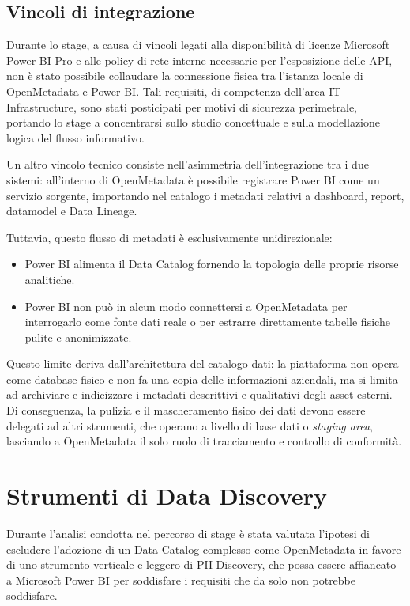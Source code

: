 \subsection{Vincoli di integrazione}
Durante lo stage, a causa di vincoli legati alla disponibilità di licenze Microsoft Power BI Pro e alle policy di rete interne necessarie per l'esposizione delle API, 
non è stato possibile collaudare la connessione fisica tra l'istanza locale di OpenMetadata e Power BI. 
Tali requisiti, di competenza dell'area IT Infrastructure, sono stati posticipati per motivi di sicurezza perimetrale, portando lo stage a concentrarsi sullo studio 
concettuale e sulla modellazione logica del flusso informativo.

Un altro vincolo tecnico consiste nell'asimmetria dell'integrazione tra i due sistemi: all'interno di OpenMetadata è possibile registrare Power BI come un servizio sorgente, 
importando nel catalogo i metadati relativi a dashboard, report, datamodel e Data Lineage.

Tuttavia, questo flusso di metadati è esclusivamente unidirezionale:
\begin{itemize}
    \item Power BI alimenta il Data Catalog fornendo la topologia delle proprie risorse analitiche.
    \item Power BI non può in alcun modo connettersi a OpenMetadata per interrogarlo come fonte dati reale o per estrarre direttamente tabelle fisiche pulite e anonimizzate.
\end{itemize}

\noindent Questo limite deriva dall'architettura del catalogo dati: la piattaforma non opera come database fisico e non fa una copia delle informazioni aziendali, ma si limita 
ad archiviare e indicizzare i metadati descrittivi e qualitativi degli asset esterni. Di conseguenza, la pulizia e il mascheramento fisico dei dati devono essere delegati 
ad altri strumenti, che operano a livello di base dati o \emph{staging area}, lasciando a OpenMetadata il solo ruolo di tracciamento e controllo di conformità.

\section{Strumenti di Data Discovery}
Durante l'analisi condotta nel percorso di stage è stata valutata l'ipotesi di escludere l'adozione di un Data Catalog complesso come OpenMetadata in favore di uno 
strumento verticale e leggero di PII Discovery, che possa essere affiancato a Microsoft Power BI per soddisfare i requisiti che da solo non potrebbe soddisfare.

